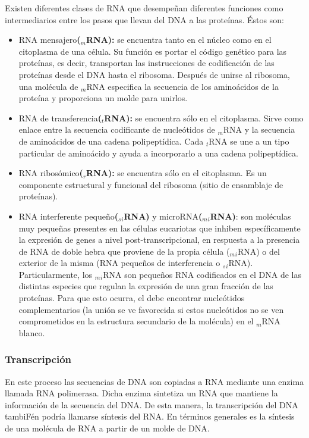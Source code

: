 Existen diferentes clases de RNA que desempeñan diferentes funciones como intermediarios entre los pasos que llevan del DNA a las proteínas. Éstos son:
\begin{itemize}
	\item RNA mensajero\textbf{($_m$RNA):} se encuentra tanto en el núcleo como en el citoplasma de una célula. Su función es portar el código genético para las proteínas, es decir, transportan las instrucciones de codificación de las proteínas desde el DNA hasta el ribosoma. Después de unirse al ribosoma, una molécula de $_m$RNA especifica la secuencia de los aminoácidos de la proteína y proporciona un molde para unirlos.
	\item RNA de transferencia\textbf{($_t$RNA):} se encuentra sólo en el citoplasma. Sirve como enlace entre la secuencia codificante de nucleótidos de $_m$RNA y la secuencia de aminoácidos de una cadena polipeptídica. Cada $_t$RNA se une a un tipo particular de aminoácido y ayuda a incorporarlo a una cadena polipeptídica.
	\item RNA ribosómico\textbf{($_r$RNA):} se encuentra sólo en el citoplasma. Es un componente estructural y funcional del ribosoma (sitio de ensamblaje de proteínas).
	\item RNA interferente pequeño\textbf{($_s$$_i$RNA)} y microRNA\textbf{($_m$$_i$RNA)}: son moléculas muy pequeñas presentes en las células eucariotas que inhiben específicamente la expresión de genes a nivel post-transcripcional, en respuesta a la presencia de RNA de doble hebra que proviene de la propia célula ($_m$$_i$RNA) o del exterior de la misma (RNA pequeños de interferencia o $_s$$_i$RNA). Particularmente, los $_m$$_i$RNA son pequeños RNA codificados en el DNA de las distintas especies que regulan la expresión de una gran fracción de las proteínas. Para que esto ocurra, el debe encontrar nucleótidos complementarios (la unión se ve favorecida si estos nucleótidos no se ven comprometidos en la estructura secundario de la molécula) en el $_m$RNA blanco. %
\end{itemize}

\subsubsection{Transcripción}
En este proceso las secuencias de DNA son copiadas a RNA mediante una enzima llamada RNA polimerasa. Dicha enzima sintetiza un RNA que mantiene la información de la secuencia del DNA. De esta manera, la transcripción del DNA tambiFén podría llamarse síntesis del RNA. En términos generales es la síntesis de una molécula de RNA a partir de un molde de DNA.

